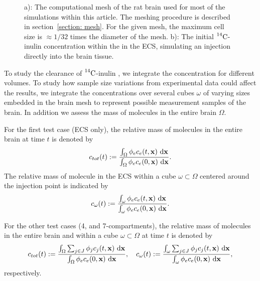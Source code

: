 \documentclass[10pt]{article}
\newcommand{\1}{^{(1)}}
\newcommand{\2}{^{(2)}}
\newcommand*{\dd}{\mathop{\kern0pt\mathrm{d}}\!{}}
\newcommand {\x}   {\mathbf{x}}
\newcommand{\Cinulin}{$\prescript{14}{}{\text{C}}$-inulin }
\begin{document}
\begin{figure}[htb]
    \centering
    \hfill
    \caption{a): The computational mesh of the rat brain used for most of the simulations within this article. The meshing procedure is described in section~\ref{section: mesh}. For the given mesh, the maximum cell size is $\approx 1/32$ times the diameter of the mesh. b): The initial \Cinulin concentration within the in the ECS, simulating an injection directly into the brain tissue.}
    \label{fig:mesh-illustration}
\end{figure}

To study the clearance of \Cinulin, we integrate the concentration for different volumes. To study how sample size variations from experimental data could affect the results, we integrate the concentrations over several cubes $\omega$ of varying sizes embedded in the brain mesh to represent possible measurement samples of the brain. In addition we assess the mass of molecules in the entire brain $\Omega$. 

For the first test case (ECS only), the relative mass of molecules in the entire brain at time $t$ is denoted by 
\[
c_{tot}(t) := \frac{\int_\Omega \phi_e c_e(t,\x) \, \dd \x }{ \int_\Omega \phi_e c_e(0,\x) \, \dd \x}.
\]
The relative mass of molecule in the ECS within a cube $\omega \subset \Omega$ centered around the injection point is indicated by 
\[
c_{\omega}(t) :=  \frac{\int_{\omega}  \phi_e c_e(t,\x) \, \dd \x }{\int_\omega  \phi_e c_e(0,\x) \, \dd \x}.  
\]

For the other test cases (4, and 7-compartments), the relative mass of molecules in the entire brain and within a cube $\omega \subset \Omega$ at time $t$ is denoted by
\[
c_{tot}(t) := \frac{\int_\Omega \sum_{j\in J}  \phi_j c_j(t,\x) \, \dd \x }{ \int_\Omega \phi_e c_e(0,\x) \, \dd \x}, \quad c_{\omega}(t) := \frac{\int_{\omega} \sum_{j\in J} \phi_j c_j(t,\x) \, \dd \x }{ \int_\omega \phi_e c_e(0,\x) \, \dd \x},
\]
respectively. 
\end{document}
